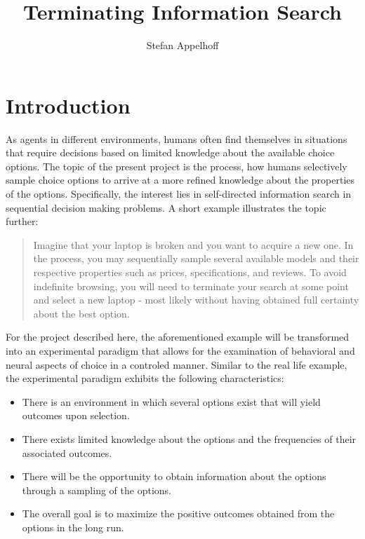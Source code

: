 \documentclass[
	12pt,
	oneside,
	bibliography=totocnumbered]{scrartcl}
\title{Terminating Information Search}
\author{Stefan Appelhoff}
\begin{document}
\maketitle
\tableofcontents
\listoffigures



\section{Introduction}

As agents in different environments, humans often find themselves in situations that require decisions based on limited knowledge about the available choice options. The topic of the present project is the process, how humans selectively sample choice options to arrive at a more refined knowledge about the properties of the options. Specifically, the interest lies in self-directed information search in sequential decision making problems. A short example illustrates the topic further: 

\begin{quotation}
Imagine that your laptop is broken and you want to acquire a new one. In the process, you may sequentially sample several available models and their respective properties such as prices, specifications, and reviews. To avoid indefinite browsing, you will need to terminate your search at some point and select a new laptop - most likely without having obtained full certainty about the best option.
\end{quotation} 

For the project described here, the aforementioned example will be transformed into an experimental paradigm that allows for the examination of behavioral and neural aspects of choice in a controled manner. Similar to the real life example, the experimental paradigm exhibits the following characteristics:

\begin{itemize}
\item There is an environment in which several options exist that will yield outcomes upon selection.
\item There exists limited knowledge about the options and the frequencies of their associated outcomes.
\item There will be the opportunity to obtain information about the options through a sampling of the options.
\item The overall goal is to maximize the positive outcomes obtained from the options in the long run.
\end{itemize}
\end{document}
